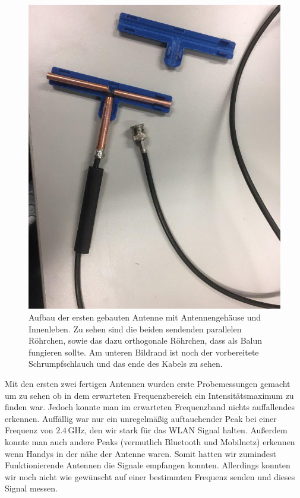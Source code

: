 \documentclass[titlepage,11pt,a4paper,ngerman]{article}
\begin{document}
\begin{figure}[ht]
	\centering
	\includegraphics[scale=0.35, trim={0cm 12cm 0cm 0cm}, clip]{Bilder/Ant_innen_1}
	\caption{Aufbau der ersten gebauten Antenne mit Antennengehäuse und Innenleben. Zu sehen sind die beiden sendenden parallelen Röhrchen, sowie das dazu orthogonale Röhrchen, dass als Balun fungieren sollte. Am unteren Bildrand ist noch der vorbereitete Schrumpfschlauch und das ende des Kabels zu sehen.}
	\label{Antenne1}
\end{figure}
Mit den ersten zwei fertigen Antennen wurden erste Probemessungen gemacht um zu sehen ob in dem erwarteten Frequenzbereich ein Intensitätsmaximum zu finden war. Jedoch konnte man im erwarteten Frequenzband nichts auffallendes erkennen. Auffällig war nur ein unregelmäßig auftauchender Peak bei einer Frequenz von $2.4\,$GHz, den wir stark für das WLAN Signal halten. Außerdem konnte man auch andere Peaks (vermutlich Bluetooth und Mobilnetz) erkennen wenn Handys in der nähe der Antenne waren. Somit hatten wir zumindest Funktionierende Antennen die Signale empfangen konnten. Allerdings konnten wir noch nicht wie gewünscht auf einer bestimmten Frequenz senden und dieses Signal messen.
\end{document}
